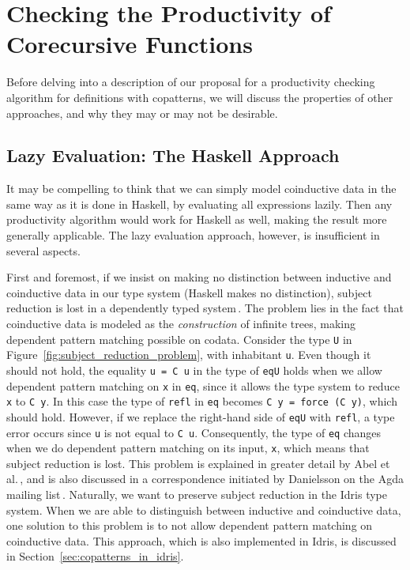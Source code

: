 \section{Checking the Productivity of Corecursive Functions}
\label{sec:productivity}

Before delving into a description of our proposal for a productivity checking algorithm for definitions with copatterns, we will discuss the properties of other approaches, and why they may or may not be desirable.

\subsection{Lazy Evaluation: The Haskell Approach}
It may be compelling to think that we can simply model coinductive data in the same way as it is done in Haskell, by evaluating all expressions lazily. Then any productivity algorithm would work for Haskell as well, making the result more generally applicable. The lazy evaluation approach, however, is insufficient in several aspects.

First and foremost, if we insist on making no distinction between inductive and coinductive data in our type system (Haskell makes no distinction), subject reduction is lost in a dependently typed system\,\citep{Abel13Copatterns}. The problem lies in the fact that coinductive data is modeled as the \emph{construction} of infinite trees, making dependent pattern matching possible on codata. Consider the type \texttt{U} in Figure~\ref{fig:subject_reduction_problem}, with inhabitant \texttt{u}. Even though it should not hold, the equality \texttt{u = C u} in the type of \texttt{eqU} holds when we allow dependent pattern matching on \texttt{x} in \texttt{eq}, since it allows the type system to reduce \texttt{x} to \texttt{C y}. In this case the type of \texttt{refl} in \texttt{eq} becomes \texttt{C y = force (C y)}, which should hold. However, if we replace the right-hand side of \texttt{eqU} with \texttt{refl}, a type error occurs since \texttt{u} is not equal to \texttt{C u}. Consequently, the type of \texttt{eq} changes when we do dependent pattern matching on its input, \texttt{x}, which means that subject reduction is lost. This problem is explained in greater detail by Abel et al.\,\citep{Abel13Copatterns}, and is also discussed in a correspondence initiated by Danielsson on the Agda mailing list\,\citep{OuryCounterexample}. Naturally, we want to preserve subject reduction in the Idris type system. When we are able to distinguish between inductive and coinductive data, one solution to this problem is to not allow dependent pattern matching on coinductive data. This approach, which is also implemented in Idris, is discussed in Section~\ref{sec:copatterns_in_idris}.

